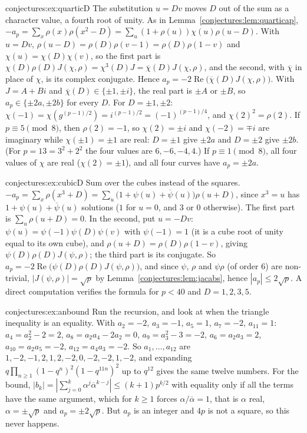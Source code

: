 \begin{solution}{conjectures:ex:quarticD}
\idea The substitution $u=Dv$ moves $D$ out of the sum as a character value, a fourth root of unity.
\writeup As in Lemma~\ref{conjectures:lem:quarticap}, $-a_p=\sum_x\rho(x)\rho(x^2-D)=\sum_u(1+\rho(u))\chi(u)\rho(u-D)$. With $u=Dv$, $\rho(u-D)=\rho(D)\rho(v-1)=\rho(D)\rho(1-v)$
and $\chi(u)=\chi(D)\chi(v)$, so the first part is $\chi(D)\rho(D)J(\chi,\rho)=\chi^3(D)J=\overline\chi(D)J(\chi,\rho)$, and the second, with $\overline\chi$ in place of
$\chi$, is its complex conjugate. Hence $a_p=-2\operatorname{Re}\bigl(\overline\chi(D)J(\chi,\rho)\bigr)$. With $J=A+Bi$ and $\overline\chi(D)\in\{\pm1,\pm i\}$, the real
part is $\pm A$ or $\pm B$, so $a_p\in\{\pm2a,\pm2b\}$ for every $D$. For $D=\pm1,\pm2$: $\chi(-1)=\chi(g^{(p-1)/2})=i^{(p-1)/2}=(-1)^{(p-1)/4}$, and $\chi(2)^2=\rho(2)$.
If $p\equiv5\pmod8$, then $\rho(2)=-1$, so $\chi(2)=\pm i$ and $\chi(-2)=\mp i$ are imaginary while $\chi(\pm1)=\pm1$ are real: $D=\pm1$ give $\pm2a$ and $D=\pm2$
give $\pm2b$. (For $p=13=3^2+2^2$ the four values are $6,-6,-4,4$.) If $p\equiv1\pmod8$, all four values of $\chi$ are real ($\chi(2)=\pm1$), and all four
curves have $a_p=\pm2a$.
\end{solution}

\begin{solution}{conjectures:ex:cubicD}
\idea Sum over the cubes instead of the squares.
\writeup $-a_p=\sum_x\rho(x^3+D)=\sum_u\bigl(1+\psi(u)+\overline\psi(u)\bigr)\rho(u+D)$, since $x^3=u$ has $1+\psi(u)+\overline\psi(u)$ solutions ($1$ for $u=0$, and $3$
or $0$ otherwise). The first part is $\sum_u\rho(u+D)=0$. In the second, put $u=-Dv$: $\psi(u)=\psi(-1)\psi(D)\psi(v)$ with $\psi(-1)=1$ (it is a cube root of unity
equal to its own cube), and $\rho(u+D)=\rho(D)\rho(1-v)$, giving $\psi(D)\rho(D)J(\psi,\rho)$; the third part is its conjugate. So
$a_p=-2\operatorname{Re}\bigl(\psi(D)\rho(D)J(\psi,\rho)\bigr)$, and since $\psi$, $\rho$ and $\psi\rho$ (of order $6$) are non-trivial, $|J(\psi,\rho)|=\sqrt p$
by Lemma~\ref{conjectures:lem:jacabs}, hence $|a_p|\le2\sqrt p$. A direct computation verifies the formula for $p<40$ and $D=1,2,3,5$.
\end{solution}

\begin{solution}{conjectures:ex:anbound}
\idea Run the recursion, and look at when the triangle inequality is an equality.
\writeup With $a_2=-2$, $a_3=-1$, $a_5=1$, $a_7=-2$, $a_{11}=1$: $a_4=a_2^2-2=2$, $a_8=a_2a_4-2a_2=0$, $a_9=a_3^2-3=-2$, $a_6=a_2a_3=2$, $a_{10}=a_2a_5=-2$,
$a_{12}=a_4a_3=-2$. So $a_1,\dots,a_{12}$ are $1,-2,-1,2,1,2,-2,0,-2,-2,1,-2$, and expanding $q\prod_{n\ge1}(1-q^n)^2(1-q^{11n})^2$ up to $q^{12}$
gives the same twelve numbers. For the bound, $|b_k|=|\sum_{j=0}^k\alpha^j\overline\alpha^{k-j}|\le(k+1)p^{k/2}$ with equality only if all the terms have the same
argument, which for $k\ge1$ forces $\alpha/\overline\alpha=1$, that is $\alpha$ real, $\alpha=\pm\sqrt p$ and $a_p=\pm2\sqrt p$. But $a_p$ is an integer and $4p$ is
not a square, so this never happens.
\end{solution}

